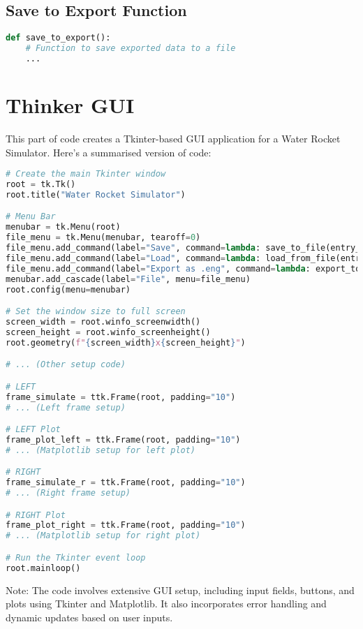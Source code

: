 \documentclass{report}
\begin{document}
\section{Save to Export Function}

\begin{lstlisting}[language=Python]
def save_to_export():
    # Function to save exported data to a file
    ...
\end{lstlisting}

\chapter{Thinker GUI}
This part of code creates a Tkinter-based GUI application for a Water Rocket Simulator. Here's a summarised version of code:

\begin{lstlisting}[language=Python]
# Create the main Tkinter window
root = tk.Tk()
root.title("Water Rocket Simulator")

# Menu Bar
menubar = tk.Menu(root)
file_menu = tk.Menu(menubar, tearoff=0)
file_menu.add_command(label="Save", command=lambda: save_to_file(entry_0))
file_menu.add_command(label="Load", command=lambda: load_from_file(entry_0))
file_menu.add_command(label="Export as .eng", command=lambda: export_to_file())
menubar.add_cascade(label="File", menu=file_menu)
root.config(menu=menubar)

# Set the window size to full screen
screen_width = root.winfo_screenwidth()
screen_height = root.winfo_screenheight()
root.geometry(f"{screen_width}x{screen_height}")

# ... (Other setup code)

# LEFT
frame_simulate = ttk.Frame(root, padding="10")
# ... (Left frame setup)

# LEFT Plot
frame_plot_left = ttk.Frame(root, padding="10")
# ... (Matplotlib setup for left plot)

# RIGHT
frame_simulate_r = ttk.Frame(root, padding="10")
# ... (Right frame setup)

# RIGHT Plot
frame_plot_right = ttk.Frame(root, padding="10")
# ... (Matplotlib setup for right plot)

# Run the Tkinter event loop
root.mainloop()
\end{lstlisting}

Note: The code involves extensive GUI setup, including input fields, buttons, and plots using Tkinter and Matplotlib. It also incorporates error handling and dynamic updates based on user inputs.
\end{document}
